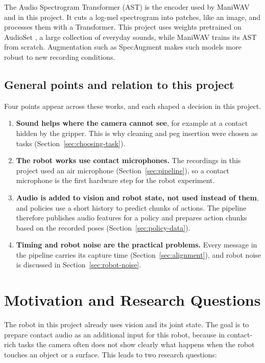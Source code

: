 \documentclass[
  english,
  accentcolor=11b,
  type=intern,
  marginpar=false,
  logofile=figures/PEARLTUDA.png
]{tudapub}
\begin{document}
The Audio Spectrogram Transformer (AST) \citep{gong2021ast} is the encoder used by ManiWAV and in this project. It cuts a log-mel spectrogram into patches, like an image, and processes them with a Transformer. This project uses weights pretrained on AudioSet \citep{gemmeke2017audioset}, a large collection of everyday sounds, while ManiWAV trains its AST from scratch. Augmentation such as SpecAugment \citep{park2019specaugment} makes such models more robust to new recording conditions.

\subsection{General points and relation to this project}
\label{sec:lit-points}

Four points appear across these works, and each shaped a decision in this project.

\begin{enumerate}[leftmargin=*,label=\textbf{P\arabic*:},itemsep=4pt]
  \item \textbf{Sound helps where the camera cannot see}, for example at a contact hidden by the gripper. This is why cleaning and peg insertion were chosen as tasks (Section~\ref{sec:choosing-task}).
  \item \textbf{The robot works use contact microphones.} The recordings in this project used an air microphone (Section~\ref{sec:pipeline}), so a contact microphone is the first hardware step for the robot experiment.
  \item \textbf{Audio is added to vision and robot state, not used instead of them}, and policies use a short history to predict chunks of actions. The pipeline therefore publishes audio features for a policy and prepares action chunks based on the recorded poses (Section~\ref{sec:policy-data}).
  \item \textbf{Timing and robot noise are the practical problems.} Every message in the pipeline carries its capture time (Section~\ref{sec:alignment}), and robot noise is discussed in Section~\ref{sec:robot-noise}.
\end{enumerate}

\section{Motivation and Research Questions}

The robot in this project already uses vision and its joint state. The goal is to prepare contact audio as an additional input for this robot, because in contact-rich tasks the camera often does not show clearly what happens when the robot touches an object or a surface. This leads to two research questions:
\end{document}
